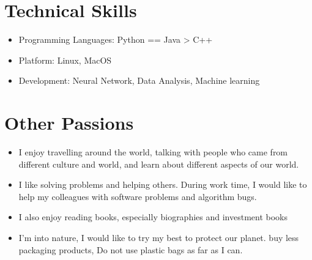 \documentclass{resume}
\begin{document}
\section{Technical Skills}
\begin{itemize}[parsep=0.5ex]
  \item Programming Languages: Python == Java > C++
  \item Platform: Linux, MacOS
  \item Development: Neural Network, Data Analysis, Machine learning
\end{itemize}

\section{Other Passions}
\begin{itemize}[parsep=0.5ex]
  \item I enjoy travelling around the world, talking with people who came from different culture and world, and learn about different aspects of our world.
  \item I like solving problems and helping others. During work time, I would like to help my colleagues with software problems and algorithm bugs.
  \item I also enjoy reading books, especially biographies and investment books
  \item I'm into nature, I would like to try my best to protect our planet. buy less packaging products, Do not use plastic bags as far as I can.
\end{itemize}
\end{document}
